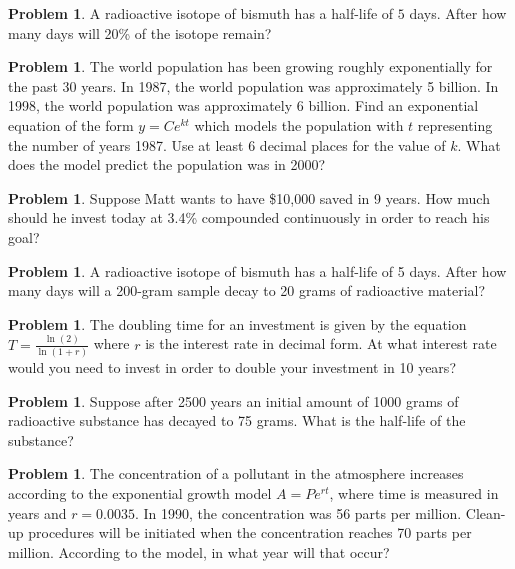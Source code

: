 \documentclass[12pt]{scrartcl}
\theoremstyle{definition}
\newtheorem{problem}[theorem]{Problem}
\begin{document}
\begin{problem}
	A radioactive isotope of bismuth has a half-life of $5$ days. After how many days will 20\% of the isotope remain?
\end{problem}

\newpage

\begin{problem}
	The world population has been growing roughly exponentially for the past 30 years. In 1987, the world population was approximately 5 billion. In 1998, the world population was approximately 6 billion. Find an exponential equation of the form $y=Ce^{kt}$ which models the population with $t$ representing the number of years 1987. Use at least 6 decimal places for the value of $k$. What does the model predict the population was in 2000?
\end{problem}

\newpage

\begin{problem}
	Suppose Matt wants to have \$10,000 saved in 9 years. How much should he invest today at 3.4\% compounded continuously in order to reach his goal?
\end{problem}

\newpage

\begin{problem}
	A radioactive isotope of bismuth has a half-life of 5 days. After how many days will a 200-gram sample decay to 20 grams of radioactive material?
\end{problem}

\newpage

\begin{problem}
	The doubling time for an investment is given by the equation $T=\frac{\ln(2)}{\ln(1+r)}$ where $r$ is the interest rate in decimal form. At what interest rate would you need to invest in order to double your investment in 10 years?
\end{problem}

\newpage

\begin{problem}
	Suppose after 2500 years an initial amount of 1000 grams of radioactive substance has decayed to 75 grams. What is the half-life of the substance?
\end{problem}

\newpage

\begin{problem}
	The concentration of a pollutant in the atmosphere increases according to the exponential growth model $A=Pe^{rt}$, where time is measured in years and $r=0.0035$. In 1990, the concentration was 56 parts per million. Clean-up procedures will be initiated when the concentration reaches 70 parts per million. According to the model, in what year will that occur?
\end{problem}
\end{document}
